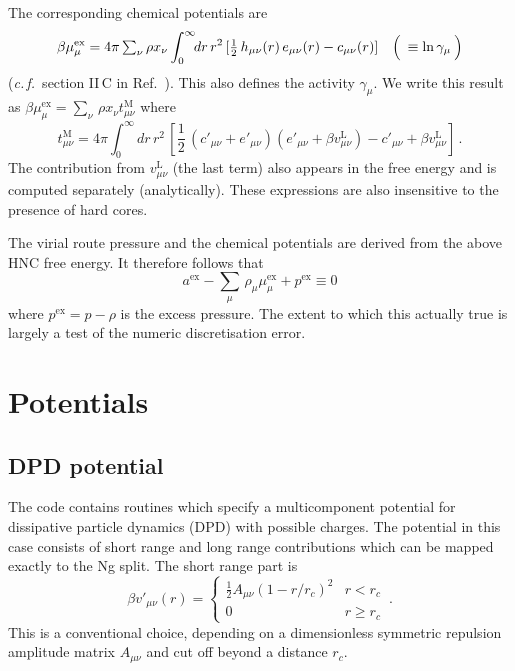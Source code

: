 \documentclass[12pt,a4paper]{article}
\newcommand{\latin}[1]{\emph{#1}}
\newcommand{\cf}{\latin{c.\,f.}}
\newcommand{\half}{{\textstyle\frac{1}{2}}}
\newcommand{\myex}{^{\mathrm{ex}}}
\newcommand{\pex}{p\myex}
\newcommand{\aex}{a\myex}
\newcommand{\muex}{\mu\myex}
\newcommand{\lr}{^{\mathrm{L}}}
\newcommand{\Refcite}[1]{Ref.~\cite{#1}}
\begin{document}
The corresponding chemical potentials are
%
\begin{equation}
\beta\muex_\mu = 4\pi\,{\textstyle \sum_{\nu}}\,\rho x_\nu 
\int_0^\infty\!\!dr\, r^2\, 
    [\half\,h_{\mu\nu}(r)\,e_{\mu\nu}(r)-c_{\mu\nu}(r)]\quad
    \Bigl(\>{}\equiv\ln\gamma_\mu\>\Bigr)
\end{equation}
%
(\cf\ section II\,C in \Refcite{Vrbka09}).  This 
also defines the activity $\gamma_\mu$.  
We
write this result as $\beta\muex_\mu = {\textstyle \sum_{\nu}}\,\rho x_\nu
t^{\mathrm{M}}_{\mu\nu}$ where
%
\begin{equation}
t^{\mathrm{M}}_{\mu\nu}=
4\pi \int_0^\infty\!\!dr\, r^2\, 
[\half\,(c'_{\mu\nu}+e'_{\mu\nu})(e'_{\mu\nu}+\beta v_{\mu\nu}\lr)
-c'_{\mu\nu}+\beta v_{\mu\nu}\lr]\,.
\end{equation}
%
The contribution from $v_{\mu\nu}\lr$ (the last term) also appears in
the free energy and is computed separately (analytically).  These
expressions are also insensitive to the presence of hard cores.

The virial route pressure and the chemical potentials are derived from
the above HNC free energy.  It therefore follows that
%
\begin{equation}
\aex - {\textstyle \sum_{\mu}}\,\rho_\mu \muex_\mu + \pex \equiv 0
\end{equation}
%
where $\pex=p-\rho$ is the excess pressure.  The extent to which this
actually true is largely a test of the numeric discretisation error.

\section{Potentials}
%
\subsection{DPD potential}
\label{sec:dpd}
%
The code contains routines which specify a multicomponent
potential for dissipative particle dynamics (DPD) with possible
charges.  The potential in this case consists of short range and long
range contributions which can be mapped exactly to the Ng split.  The
short range part is
%
\newcommand{\rc}{r_c}
\newcommand{\lB}{l_{\mathrm{B}}}
\begin{equation}
\beta v'_{\mu\nu}(r)=\left\{\begin{array}{ll}
\frac{1}{2}A_{\mu\nu}(1-r/\rc)^2 & r<\rc\\[3pt]
0 & r \ge \rc
\end{array}\right.\,.
\end{equation}
%
This is a conventional choice, depending on a dimensionless symmetric
repulsion amplitude matrix $A_{\mu\nu}$ and cut off beyond a
distance $\rc$.
\end{document}
